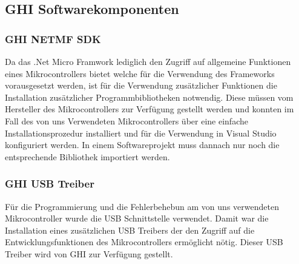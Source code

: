 \subsection{GHI Softwarekomponenten}
\subsubsection{GHI NETMF SDK}
Da das .Net Micro Framwork lediglich den Zugriff auf allgemeine Funktionen eines Mikrocontrollers bietet welche für die Verwendung des Frameworks vorausgesetzt werden, ist für die Verwendung zusätzlicher Funktionen die Installation zusätzlicher Programmbibliotheken notwendig. Diese müssen vom Hersteller des Mikrocontrollers zur Verfügung gestellt werden und konnten im Fall des von uns Verwendeten Mikrocontrollers über eine einfache Installationsprozedur installiert und für die Verwendung in Visual Studio konfiguriert werden. In einem Softwareprojekt muss dannach nur noch die entsprechende Bibliothek importiert werden.

\subsubsection{GHI USB Treiber}
Für die Programmierung und die Fehlerbehebun am von uns verwendeten Mikrocontroller wurde die USB Schnittstelle verwendet. Damit war die Installation eines zusätzlichen USB Treibers der den Zugriff auf die Entwicklungsfunktionen des Mikrocontrollers ermöglicht nötig. Dieser USB Treiber wird von GHI zur Verfügung gestellt.